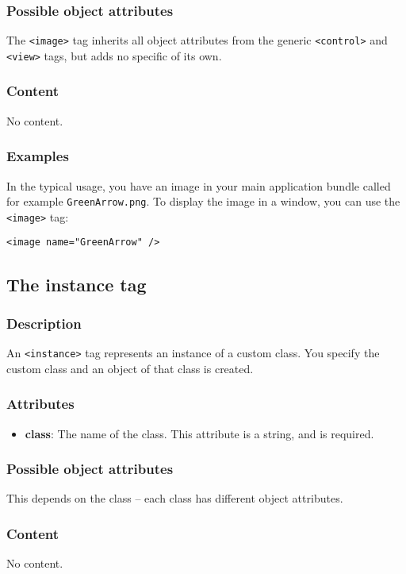 \subsubsection{Possible object attributes}
The \texttt{<image>} tag inherits all object attributes from the
generic \texttt{<control>} and \texttt{<view>} tags, but adds no
specific of its own.

\subsubsection{Content}
No content.

\subsubsection{Examples}
In the typical usage, you have an image in your main application
bundle called for example \texttt{GreenArrow.png}.  To display the
image in a window, you can use the \texttt{<image>} tag:
\begin{verbatim}
<image name="GreenArrow" />
\end{verbatim}

\subsection{The instance tag}

\subsubsection{Description}
An \texttt{<instance>} tag represents an instance of a custom class.  You
specify the custom class and an object of that class is created.

\subsubsection{Attributes}
\begin{itemize}
\item {\bf class}: The name of the class.  This attribute is a string, and 
is required.
\end{itemize}

\subsubsection{Possible object attributes}
This depends on the class -- each class has different object attributes.

\subsubsection{Content}
No content.

